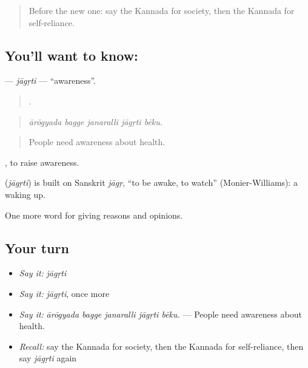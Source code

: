 \label{lesson:KA-C403-jagrti}



\begin{quote}
Before the new one: say the Kannada for society, then the Kannada for self-reliance.
\end{quote}

\subsection*{You'll want to know: }
\textbf{} — \emph{jāgṛti} — \textquotedblleft{}awareness\textquotedblright{}.

\begin{quote}
    .
\end{quote}

\begin{quote}
\emph{ārōgyada bagge janaralli jāgṛti bēku.}
\end{quote}

\begin{quote}
People need awareness about health.
\end{quote}

 , to raise awareness.

\begin{cousinweb}
\textbf{} (\emph{jāgṛti}) is built on Sanskrit \emph{jāgṛ}, \textquotedblleft{}to be awake, to watch\textquotedblright{} (Monier-Williams): a waking up.
\end{cousinweb}

\begin{grammarlens}[title={What you've built}]
One more word for giving reasons and opinions.
\end{grammarlens}

\subsection*{Your turn}
\begin{itemize}
\raggedright
  \item \emph{Say it:} \emph{jāgṛti}
  \item \emph{Say it:} \emph{jāgṛti}, once more
  \item \emph{Say it:} \emph{ārōgyada bagge janaralli jāgṛti bēku.} — People need awareness about health.
  \item \emph{Recall:} say the Kannada for society, then the Kannada for self-reliance, then say \emph{jāgṛti} again
\end{itemize}

